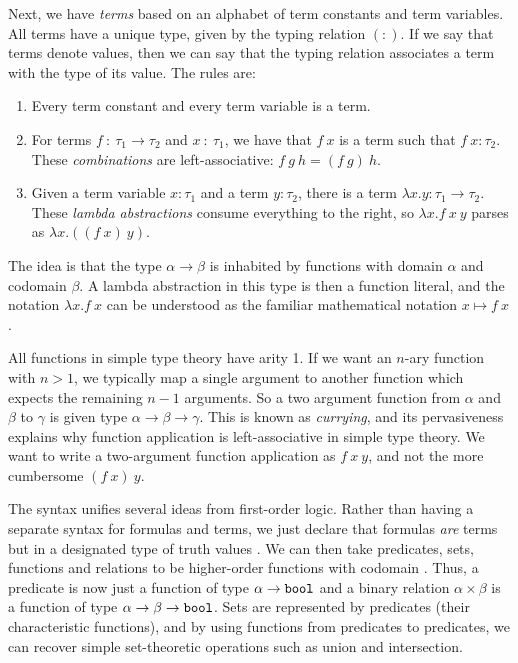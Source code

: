 Next, we have \emph{terms} based on an alphabet of term constants and term variables. All terms have a unique type, given by the typing relation $(:)$. If we say that terms denote values, then we can say that the typing relation associates a term with the type of its value. The rules are:
\begin{enumerate}
\item Every term constant and every term variable is a term.
\item For terms $f\ :\ \tau_1\rightarrow\tau_2$ and $x\ :\ \tau_1$, we have that $f\ x$ is a term such that \mbox{$f\ x : \tau_2$}. These \emph{combinations} are left-associative: $f\ g\ h = (f\ g)\ h$.
\item Given a term variable $x : \tau_1$ and a term $y : \tau_2$, there is a term $\lambda x. y : \tau_1 \rightarrow \tau_2$. These \emph{lambda abstractions} consume everything to the right, so $\lambda x. f\ x\ y$ parses as $\lambda x. ((f\ x)\ y)$.
\end{enumerate}

The idea is that the type $\alpha \rightarrow \beta$ is inhabited by functions with domain $\alpha$ and codomain $\beta$. A lambda abstraction in this type is then a function literal, and the notation $\lambda x. f\ x$ can be understood as the familiar mathematical notation $x \mapsto f\ x$.

All functions in simple type theory have arity 1. If we want an $n$-ary function with \mbox{$n>1$}, we typically map a single argument to another function which expects the remaining $n-1$ arguments. So a two argument function from $\alpha$ and $\beta$ to $\gamma$ is given type $\alpha \rightarrow \beta \rightarrow \gamma$. This is known as \emph{currying}, and its pervasiveness explains why function application is left-associative in simple type theory. We want to write a two-argument function application as $f\ x\ y$, and not the more cumbersome $(f\ x)\ y$.

The syntax unifies several ideas from first-order logic. Rather than having a separate syntax for formulas and terms, we just declare that formulas \emph{are} terms but in a designated type  of truth values . We can then take predicates, sets, functions and relations to be higher-order functions with codomain . Thus, a predicate is now just a function of type $\alpha \rightarrow \texttt{bool}$ and a binary relation $\alpha \times \beta$ is a function of type $\alpha \rightarrow \beta \rightarrow \texttt{bool}$. Sets are represented by predicates (their characteristic functions), and by using functions from predicates to predicates, we can recover simple set-theoretic operations such as union and intersection.

